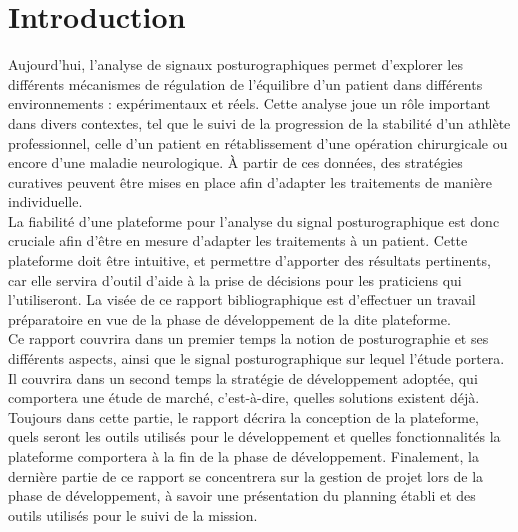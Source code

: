 \section{Introduction}

Aujourd’hui, l’analyse de signaux posturographiques permet d’explorer les différents mécanismes de régulation de l’équilibre d’un patient dans différents environnements :  expérimentaux et réels. Cette analyse joue un rôle important dans divers contextes, tel que le suivi de la progression de la stabilité d’un athlète professionnel, celle d’un patient en rétablissement d’une opération chirurgicale ou encore d’une maladie neurologique. À partir de ces données, des stratégies curatives peuvent être mises en place afin d’adapter les traitements de manière individuelle.\\
 La fiabilité d’une plateforme pour l’analyse du signal posturographique est donc cruciale afin d’être en mesure d’adapter les traitements à un patient. Cette plateforme doit être intuitive, et permettre d’apporter des résultats pertinents, car elle servira d’outil d’aide à la prise de décisions pour les praticiens qui l’utiliseront. La visée de ce rapport bibliographique est d’effectuer un travail préparatoire en vue de la phase de développement de la dite plateforme.\\
 Ce rapport couvrira dans un premier temps la notion de posturographie et ses différents aspects, ainsi que le signal posturographique sur lequel l’étude portera. Il couvrira dans un second temps la stratégie de développement adoptée, qui comportera une étude de marché, c’est-à-dire, quelles solutions existent déjà. Toujours dans cette partie, le rapport décrira la conception de la plateforme, quels seront les outils utilisés pour le développement et quelles fonctionnalités la plateforme comportera à la fin de la phase de développement. Finalement, la dernière partie de ce rapport se concentrera sur la gestion de projet lors de la phase de développement, à savoir une présentation du planning établi et des outils utilisés pour le suivi de la mission.

